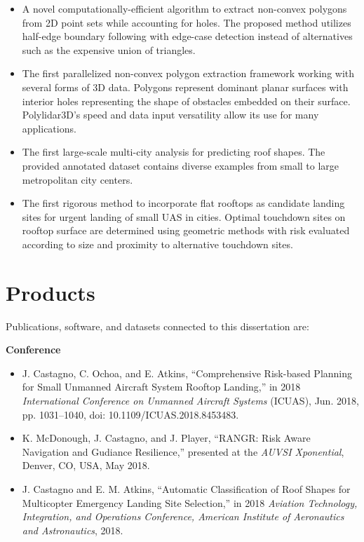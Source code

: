 \begin{itemize}[noitemsep]
      \item A novel computationally-efficient algorithm to extract non-convex polygons from 2D point sets while accounting for holes. The proposed method utilizes half-edge boundary following with edge-case detection instead of alternatives such as the expensive union of triangles.
      \item The first parallelized non-convex polygon extraction framework working with several forms of 3D data. Polygons represent dominant planar surfaces with interior holes representing the shape of obstacles embedded on their surface. Polylidar3D's speed and data input versatility allow its use for many applications.
      \item The first large-scale multi-city analysis for predicting roof shapes. The provided annotated dataset contains diverse examples from small to large metropolitan city centers. 
      \item The first rigorous method to incorporate flat rooftops as candidate landing sites for urgent landing of small UAS in cities.  Optimal touchdown sites on rooftop surface are determined using geometric methods with risk evaluated according to size and proximity to alternative touchdown sites.
\end{itemize}


\section{Products}

Publications, software, and datasets connected to this dissertation are:
\vspace{0.2cm}

\textbf{Conference}
\vspace{0.20cm}
\begin{itemize}[noitemsep]
    \item J. Castagno, C. Ochoa, and E. Atkins, ``Comprehensive Risk-based Planning for Small Unmanned Aircraft System Rooftop Landing,” in 2018 \emph{International Conference on Unmanned Aircraft Systems} (ICUAS), Jun. 2018, pp. 1031–1040, doi: 10.1109/ICUAS.2018.8453483.
    \item K. McDonough, J. Castagno, and J. Player, ``RANGR: Risk Aware Navigation and Gudiance Resilience,” presented at the \emph{AUVSI Xponential}, Denver, CO, USA, May 2018.
	\item J. Castagno and E. M. Atkins, ``Automatic Classification of Roof Shapes for Multicopter Emergency Landing Site Selection,” in 2018 \emph{Aviation Technology, Integration, and Operations Conference, American Institute of Aeronautics and Astronautics}, 2018.
\end{itemize}

